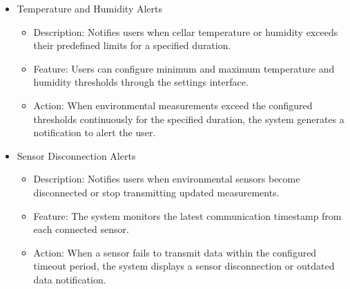 \documentclass[conference]{IEEEtran}
\begin{document}
\begin{itemize}
    \item Temperature and Humidity Alerts
    \begin{itemize}
        \item Description: Notifies users when cellar temperature or humidity exceeds their predefined limits for a specified duration.
        \item Feature: Users can configure minimum and maximum temperature and humidity thresholds through the settings interface.
        \item Action: When environmental measurements exceed the configured thresholds continuously for the specified duration, the system generates a notification to alert the user.
    \end{itemize}

    \item Sensor Disconnection Alerts
    \begin{itemize}
        \item Description: Notifies users when environmental sensors become disconnected or stop transmitting updated measurements.
        \item Feature: The system monitors the latest communication timestamp from each connected sensor.
        \item Action: When a sensor fails to transmit data within the configured timeout period, the system displays a sensor disconnection or outdated data notification.
    \end{itemize}
\end{itemize}
\end{document}
